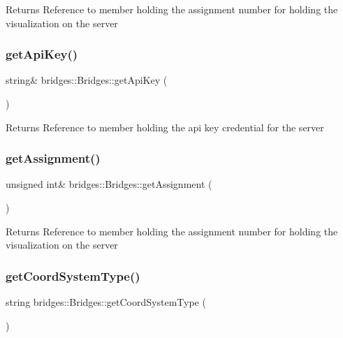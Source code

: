 \begin{DoxyReturn}{Returns}
Reference to member holding the assignment number for holding the visualization on the server 
\end{DoxyReturn}
\mbox{\label{namespacebridges_1_1_bridges_a76925874a2d859dd770b86ab89105ddd}} 
\subsubsection{\texorpdfstring{get\+Api\+Key()}{getApiKey()}}
{\footnotesize\ttfamily string\& bridges\+::\+Bridges\+::get\+Api\+Key (\begin{DoxyParamCaption}{ }\end{DoxyParamCaption})}

\begin{DoxyReturn}{Returns}
Reference to member holding the api key credential for the server 
\end{DoxyReturn}
\mbox{\label{namespacebridges_1_1_bridges_a535d05a7e5d2bc4775086c53b78a3f06}} 
\subsubsection{\texorpdfstring{get\+Assignment()}{getAssignment()}}
{\footnotesize\ttfamily unsigned int\& bridges\+::\+Bridges\+::get\+Assignment (\begin{DoxyParamCaption}{ }\end{DoxyParamCaption})}

\begin{DoxyReturn}{Returns}
Reference to member holding the assignment number for holding the visualization on the server 
\end{DoxyReturn}
\mbox{\label{namespacebridges_1_1_bridges_a31f5db39ab9ce7df3e635eaaad1feb12}} 
\subsubsection{\texorpdfstring{get\+Coord\+System\+Type()}{getCoordSystemType()}}
{\footnotesize\ttfamily string bridges\+::\+Bridges\+::get\+Coord\+System\+Type (\begin{DoxyParamCaption}{ }\end{DoxyParamCaption})}

